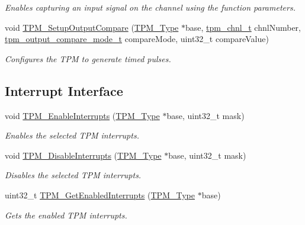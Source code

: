 \begin{DoxyCompactItemize}
\begin{DoxyCompactList}\small\item\em Enables capturing an input signal on the channel using the function parameters. \end{DoxyCompactList}\item 
void \mbox{\hyperlink{group__tpm_ga382c4ecd344bc208cd6aa60287442a50}{T\+P\+M\+\_\+\+Setup\+Output\+Compare}} (\mbox{\hyperlink{struct_t_p_m___type}{T\+P\+M\+\_\+\+Type}} $\ast$base, \mbox{\hyperlink{group__tpm_gacda6962369e014c8ac72d1b58b224deb}{tpm\+\_\+chnl\+\_\+t}} chnl\+Number, \mbox{\hyperlink{group__tpm_gae76bda507d28f3c302f4cdfeee61ba5e}{tpm\+\_\+output\+\_\+compare\+\_\+mode\+\_\+t}} compare\+Mode, uint32\+\_\+t compare\+Value)
\begin{DoxyCompactList}\small\item\em Configures the T\+PM to generate timed pulses. \end{DoxyCompactList}\end{DoxyCompactItemize}
\subsection*{Interrupt Interface}
\begin{DoxyCompactItemize}
\item 
void \mbox{\hyperlink{group__tpm_ga1e6563023f023ee826e687d3668b4247}{T\+P\+M\+\_\+\+Enable\+Interrupts}} (\mbox{\hyperlink{struct_t_p_m___type}{T\+P\+M\+\_\+\+Type}} $\ast$base, uint32\+\_\+t mask)
\begin{DoxyCompactList}\small\item\em Enables the selected T\+PM interrupts. \end{DoxyCompactList}\item 
void \mbox{\hyperlink{group__tpm_ga254be07975c63ee2983421df1d2f0d40}{T\+P\+M\+\_\+\+Disable\+Interrupts}} (\mbox{\hyperlink{struct_t_p_m___type}{T\+P\+M\+\_\+\+Type}} $\ast$base, uint32\+\_\+t mask)
\begin{DoxyCompactList}\small\item\em Disables the selected T\+PM interrupts. \end{DoxyCompactList}\item 
uint32\+\_\+t \mbox{\hyperlink{group__tpm_gafb59e6f67ff4281f14a9d10f25839208}{T\+P\+M\+\_\+\+Get\+Enabled\+Interrupts}} (\mbox{\hyperlink{struct_t_p_m___type}{T\+P\+M\+\_\+\+Type}} $\ast$base)
\begin{DoxyCompactList}\small\item\em Gets the enabled T\+PM interrupts. \end{DoxyCompactList}\end{DoxyCompactItemize}


